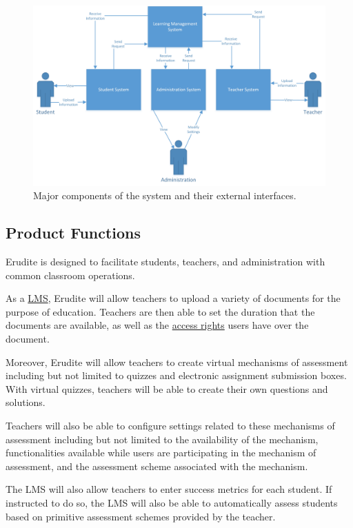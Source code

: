 \documentclass[]{article}
\begin{document}
\begin{figure}[h]
  \centering
  \includegraphics[scale=0.7]{A1_Assets/2-1_Product_Perspective_Diagram.jpg}
  \caption{Major components of the system and their external interfaces.}
\end{figure}



\subsection{Product Functions}
\label{sub:product_functions}
Erudite is designed to facilitate students, teachers, and administration
with common classroom operations.

As a \underline{LMS}, Erudite will allow teachers to upload a variety of
documents for
the purpose of education. Teachers are then able to set the duration that the
documents are available, as well as the \underline{access rights} users
have over the document.

Moreover, Erudite will allow teachers to create virtual mechanisms of
assessment including but not limited to quizzes and electronic assignment
submission boxes. With virtual quizzes, teachers will be able to create their
own questions and solutions.

Teachers will also be able to configure settings related to these mechanisms of
assessment including but not limited to the availability of the mechanism,
functionalities available while users are participating in the mechanism of
assessment, and the assessment scheme associated with the mechanism.

The LMS will also allow teachers to enter success metrics for each student. If
instructed to do so, the LMS will also be able to automatically assess students
based on primitive assessment schemes provided by the teacher.
\end{document}
